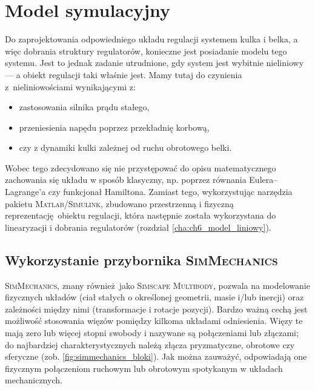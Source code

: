 \chapter{Model symulacyjny}
\label{cha:ch4_model_symulacyjny}

Do zaprojektowania odpowiedniego układu regulacji systemem kulka i belka, a więc dobrania struktury regulatorów, konieczne jest posiadanie modelu tego systemu. Jest to jednak zadanie utrudnione, gdy system jest wybitnie nieliniowy --- a obiekt regulacji taki właśnie jest. Mamy tutaj do czynienia z~nieliniowościami wynikającymi z:
\begin{itemize}
    \item zastosowania silnika prądu stałego,
    \item przeniesienia napędu poprzez przekładnię korbową,
    \item czy z dynamiki kulki zależnej od ruchu obrotowego belki.
\end{itemize}

Wobec tego zdecydowano się nie przystępować do opisu matematycznego zachowania się układu w sposób klasyczny, np. poprzez równania Eulera--Lagrange'a czy funkcjonał Hamiltona. Zamiast tego, wykorzystując narzędzia pakietu \textsc{Matlab/Simulink}, zbudowano przestrzenną i fizyczną reprezentację obiektu regulacji, która następnie została wykorzystana do linearyzacji i dobrania regulatorów (rozdział \ref{cha:ch6_model_liniowy}).

\section{Wykorzystanie przybornika \textsc{SimMechanics}}
\label{sec:ch4_simmechanics}

\textsc{SimMechanics}, znany również jako \textsc{Simscape Multibody}, pozwala na modelowanie fizycznych układów (ciał stałych o określonej geometrii, masie i/lub inercji) oraz zależności między nimi (transformacje i rotacje pozycji). Bardzo ważną cechą jest możliwość stosowania więzów pomiędzy kilkoma układami odniesienia. Więzy te mają zero lub więcej stopni swobody i nazywane są połączeniami lub złączami; do najbardziej charakterystycznych należą złącza pryzmatyczne, obrotowe czy sferyczne (zob. \cref{fig:simmechanics_bloki}). Jak można zauważyć, odpowiadają one fizycznym połączeniom ruchowym lub obrotowym spotykanym w układach mechanicznych.

